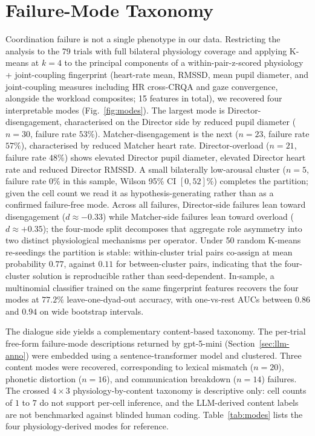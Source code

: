 \section{Failure-Mode Taxonomy}\label{sec:modes}
Coordination failure is not a single phenotype in our data. Restricting the analysis to the 79 trials with full bilateral physiology coverage and applying K-means at $k=4$ to the principal components of a within-pair-z-scored physiology + joint-coupling fingerprint (heart-rate mean, RMSSD, mean pupil diameter, and joint-coupling measures including HR cross-CRQA and gaze convergence, alongside the workload composites; 15 features in total), we recovered four interpretable modes (Fig.~\ref{fig:modes}). The largest mode is Director-disengagement, characterised on the Director side by reduced pupil diameter ($n=30$, failure rate $53\%$). Matcher-disengagement is the next ($n=23$, failure rate $57\%$), characterised by reduced Matcher heart rate. Director-overload ($n=21$, failure rate $48\%$) shows elevated Director pupil diameter, elevated Director heart rate and reduced Director RMSSD. A small bilaterally low-arousal cluster ($n=5$, failure rate $0\%$ in this sample, Wilson 95\% CI $[0, 52]\%$) completes the partition; given the cell count we read it as hypothesis-generating rather than as a confirmed failure-free mode. Across all failures, Director-side failures lean toward disengagement ($d \approx -0.33$) while Matcher-side failures lean toward overload ($d \approx +0.35$); the four-mode split decomposes that aggregate role asymmetry into two distinct physiological mechanisms per operator. Under 50 random K-means re-seedings the partition is stable: within-cluster trial pairs co-assign at mean probability $0.77$, against $0.11$ for between-cluster pairs, indicating that the four-cluster solution is reproducible rather than seed-dependent. In-sample, a multinomial classifier trained on the same fingerprint features recovers the four modes at $77.2\%$ leave-one-dyad-out accuracy, with one-vs-rest AUCs between $0.86$ and $0.94$ on wide bootstrap intervals.

The dialogue side yields a complementary content-based taxonomy. The per-trial free-form failure-mode descriptions returned by gpt-5-mini (Section~\ref{sec:llm-anno}) were embedded using a sentence-transformer model and clustered. Three content modes were recovered, corresponding to lexical mismatch ($n=20$), phonetic distortion ($n=16$), and communication breakdown ($n=14$) failures. The crossed $4 \times 3$ physiology-by-content taxonomy is descriptive only: cell counts of $1$ to $7$ do not support per-cell inference, and the LLM-derived content labels are not benchmarked against blinded human coding. Table~\ref{tab:modes} lists the four physiology-derived modes for reference.

